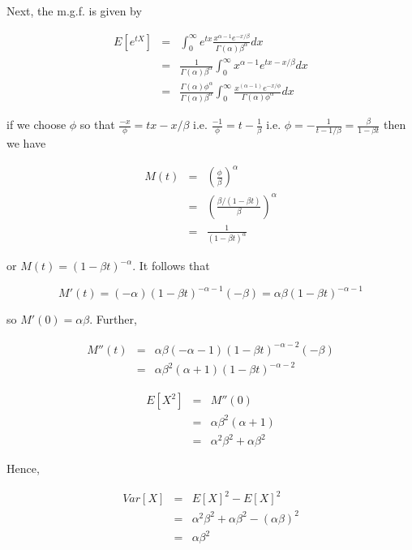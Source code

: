 \documentclass[12pt,a4paper]{article}
\theoremstyle{regla}
\theoremstyle{remark}
\theoremstyle{definition}
\theoremstyle{nonumberbreak}
\begin{document}
Next, the m.g.f. is given by 

\begin{eqnarray*}
E[e^{tX}] & = & \int_{0}^{\infty} e^{tx}  
                \frac{x^{\alpha-1}e^{-x/\beta}}
                     {\Gamma(\alpha)\beta^{\alpha}} 
                dx \\
& = & \frac{1}{\Gamma(\alpha)\beta^{\alpha}} 
\int_{0}^{\infty} x^{\alpha-1} e^{tx - x/\beta} dx \\
& = &  \frac{\Gamma(\alpha) \phi^{\alpha} }
            {\Gamma(\alpha) \beta^{\alpha}} 
\int_{0}^{\infty} \frac{x^{(\alpha-1)} e^{-x/\phi}} {\Gamma (\alpha) \phi^{\alpha}}dx 
\end{eqnarray*} 


if we choose $\phi$ so that $\frac{-x}{\phi} = tx - x/\beta$ i.e. $\frac{-1}{\phi} = t - \frac{1}{\beta}$ 
i.e. $\phi = - \frac{1}{t-1/\beta} = \frac{\beta}{1 - \beta t}$
then we have 

\begin{eqnarray*}
M(t) & = & \left(\frac{\phi}{\beta}\right)^{\alpha} \\
& = & \left(\frac{\beta / (1-\beta t)}{\beta}\right)^{\alpha} \\
& = & \frac{1}{(1-\beta t)^{\alpha} }
\end{eqnarray*} 

or $M(t) = (1-\beta t)^{-\alpha}$.
It follows that

$$ M'(t) = (-\alpha) (1-\beta t)^{-\alpha-1} (-\beta) = \alpha\beta(1-\beta t)^{-\alpha-1}$$

so $ M'(0) = \alpha\beta $. Further, 

\begin{eqnarray*}
M''(t) & = & \alpha\beta (-\alpha-1)(1-\beta t)^{-\alpha-2} (-\beta) \\
& = & \alpha\beta^2 (\alpha+1)(1-\beta t)^{-\alpha-2} 
\end{eqnarray*} 

\begin{eqnarray*}
E[X^2] & = & M''(0) \\
& = & \alpha\beta^2 (\alpha+1) \\
& = & \alpha^2 \beta^2 + \alpha \beta^2
\end{eqnarray*} 

Hence, 

\begin{eqnarray*}
Var[X] & = & E[X]^2 - E[X]^2\\
& = & \alpha^2 \beta^2 + \alpha \beta^2 - (\alpha\beta)^2 \\
& = & \alpha \beta^2
\end{eqnarray*} 
\end{document}
